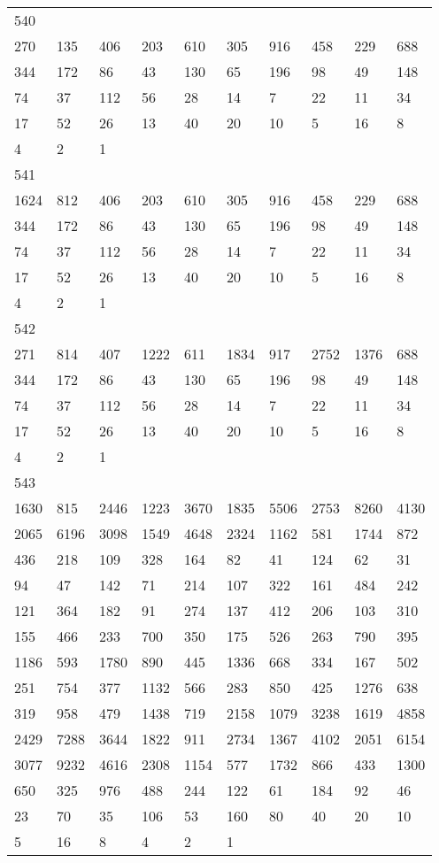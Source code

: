 \begin{longtable}{*{10}{l}}
540&&&&&&&&&\\
270& 135& 406& 203& 610& 305& 916& 458& 229& 688\\
344& 172& 86& 43& 130& 65& 196& 98& 49& 148\\
74& 37& 112& 56& 28& 14& 7& 22& 11& 34\\
17& 52& 26& 13& 40& 20& 10& 5& 16& 8\\
4& 2& 1& \\

541&&&&&&&&&\\
1624& 812& 406& 203& 610& 305& 916& 458& 229& 688\\
344& 172& 86& 43& 130& 65& 196& 98& 49& 148\\
74& 37& 112& 56& 28& 14& 7& 22& 11& 34\\
17& 52& 26& 13& 40& 20& 10& 5& 16& 8\\
4& 2& 1& \\

542&&&&&&&&&\\
271& 814& 407& 1222& 611& 1834& 917& 2752& 1376& 688\\
344& 172& 86& 43& 130& 65& 196& 98& 49& 148\\
74& 37& 112& 56& 28& 14& 7& 22& 11& 34\\
17& 52& 26& 13& 40& 20& 10& 5& 16& 8\\
4& 2& 1& \\

543&&&&&&&&&\\
1630& 815& 2446& 1223& 3670& 1835& 5506& 2753& 8260& 4130\\
2065& 6196& 3098& 1549& 4648& 2324& 1162& 581& 1744& 872\\
436& 218& 109& 328& 164& 82& 41& 124& 62& 31\\
94& 47& 142& 71& 214& 107& 322& 161& 484& 242\\
121& 364& 182& 91& 274& 137& 412& 206& 103& 310\\
155& 466& 233& 700& 350& 175& 526& 263& 790& 395\\
1186& 593& 1780& 890& 445& 1336& 668& 334& 167& 502\\
251& 754& 377& 1132& 566& 283& 850& 425& 1276& 638\\
319& 958& 479& 1438& 719& 2158& 1079& 3238& 1619& 4858\\
2429& 7288& 3644& 1822& 911& 2734& 1367& 4102& 2051& 6154\\
3077& 9232& 4616& 2308& 1154& 577& 1732& 866& 433& 1300\\
650& 325& 976& 488& 244& 122& 61& 184& 92& 46\\
23& 70& 35& 106& 53& 160& 80& 40& 20& 10\\
5& 16& 8& 4& 2& 1& \\


\end{longtable}
